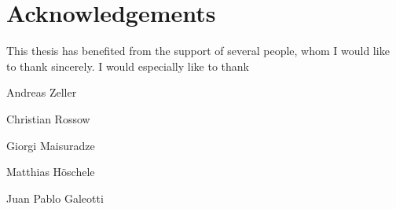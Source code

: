 \section*{Acknowledgements}
This thesis has benefited from the support of several people, whom I would like to thank sincerely.
I would especially like to thank
\begin{description*}
	\item[] Andreas Zeller
	\item[] Christian Rossow
	\item[] Giorgi Maisuradze
	\item[] Matthias Höschele
	\item[] Juan Pablo Galeotti
	\item[] 
\end{description*}
